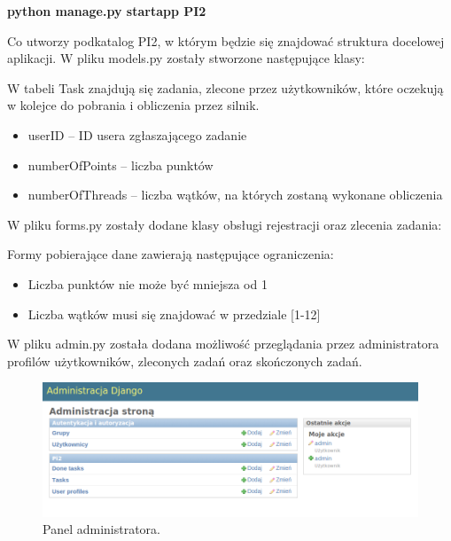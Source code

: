 \documentclass[a4paper,12pt]{article}		%
\begin{document}
\begin{center}
\textbf{python manage.py startapp PI2}
\end{center}

Co utworzy podkatalog PI2, w którym będzie się znajdować struktura docelowej aplikacji. W pliku models.py zostały stworzone następujące klasy:



W tabeli Task znajdują się zadania, zlecone przez użytkowników, które oczekują w kolejce do pobrania i obliczenia przez silnik. 

\begin{itemize}
\item userID – ID usera zgłaszającego zadanie
\item numberOfPoints – liczba punktów
\item numberOfThreads – liczba wątków, na których zostaną wykonane obliczenia
\end{itemize}

W pliku forms.py zostały dodane klasy obsługi rejestracji oraz zlecenia zadania:



Formy pobierające dane zawierają następujące ograniczenia:
\begin{itemize}
\item Liczba punktów nie może być mniejsza od 1
\item Liczba wątków musi się znajdować w przedziale [1-12]
\end{itemize}

W pliku admin.py została dodana możliwość przeglądania przez administratora profilów użytkowników, zleconych zadań oraz skończonych zadań.

\begin{figure}[h!]
\centering
\includegraphics[scale=0.6]{Resources/screenAdmin.png}
\caption{Panel administratora.} 
\end{figure} 
\end{document}
